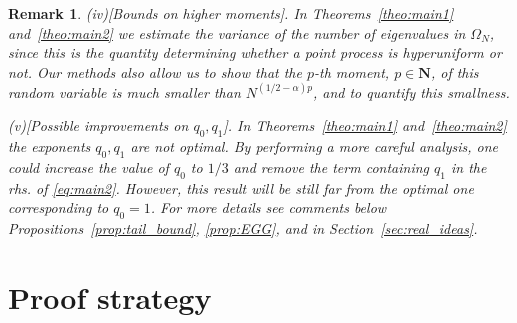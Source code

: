 \documentclass[10pt]{amsart}
\newtheorem{remark}[theorem]{Remark}
\numberwithin{equation}{section}
\newcommand{\N}{\mathbf{N}}
\begin{document}
\begin{remark}
\smallskip

\emph{(iv)[Bounds on higher moments].} In Theorems~\ref{theo:main1} and~\ref{theo:main2} we estimate the variance of the number of eigenvalues in $\Omega_N$, since this is the quantity determining whether a point process is hyperuniform or not. Our methods also allow us to show that the $p$-th moment, $p\in\N$, of this random variable is much smaller than $N^{(1/2-\alpha)p}$, and to quantify this smallness.

\smallskip

\emph{(v)[Possible improvements on $q_0, q_1$].} In Theorems~\ref{theo:main1} and~\ref{theo:main2} the exponents $q_0,q_1$ are not optimal. By performing a more careful analysis, one could increase the value of $q_0$ to $1/3$ and remove the term containing $q_1$ in the rhs. of \eqref{eq:main2}. However, this result will be still far from the optimal one corresponding to $q_0=1$. For more details see comments below Propositions~\ref{prop:tail_bound}, \ref{prop:EGG}, and in Section~\ref{sec:real_ideas}.
\end{remark}



\section{Proof strategy}
\label{sec:proofstrat}
\end{document}
